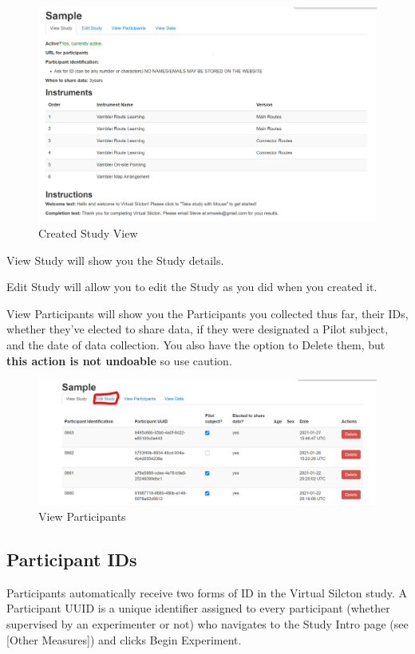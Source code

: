 \documentclass[
  12pt,
]{book}
\begin{document}
\begin{figure}
\centering
\includegraphics{./figs/web_studies_2.png}
\caption{Created Study View}
\end{figure}

View Study will show you the Study details.

Edit Study will allow you to edit the Study as you did when you created it.

View Participants will show you the Participants you collected thus far, their IDs, whether they've elected to share data, if they were designated a Pilot subject, and the date of data collection. You also have the option to Delete them, but \textbf{this action is not undoable} so use caution.

\begin{figure}
\centering
\includegraphics{./figs/web_studies_3.png}
\caption{View Participants}
\end{figure}

\hypertarget{participant-ids}{%
\subsection{Participant IDs}\label{participant-ids}}

Participants automatically receive two forms of ID in the Virtual Silcton study. A Participant UUID is a unique identifier assigned to every participant (whether supervised by an experimenter or not) who navigates to the Study Intro page (see {[}Other Measures{]}) and clicks Begin Experiment.
\end{document}
